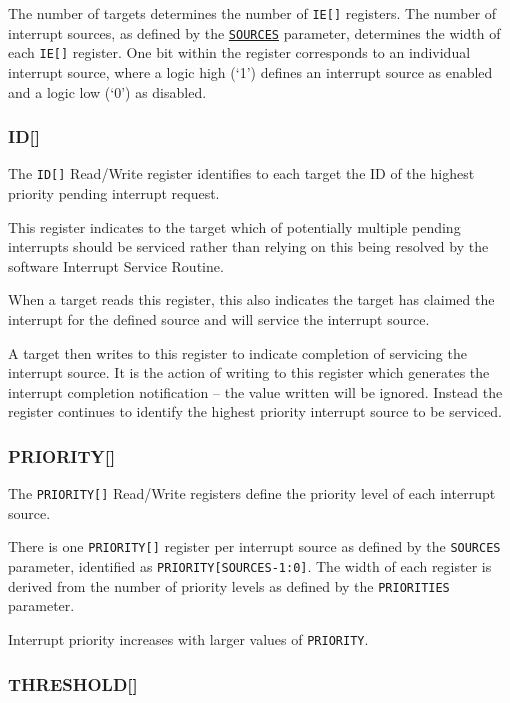 The number of targets determines the number of \texttt{IE[]} registers.
The number of interrupt sources, as defined by the \protect\hyperlink{SOURCES}{\texttt{SOURCES}} parameter, determines the width of each \texttt{IE[]} register.
One bit within the register corresponds to an individual interrupt source, where a logic high (`1') defines an interrupt source as enabled and a logic low (`0') as disabled.

\subsubsection{ID[]}

The \texttt{ID[]} Read/Write register identifies to each target the ID of the highest priority pending interrupt request.

This register indicates to the target which of potentially multiple
pending interrupts should be serviced rather than relying on this being
resolved by the software Interrupt Service Routine.

When a target reads this register, this also indicates the target has
claimed the interrupt for the defined source and will service the interrupt source.

A target then writes to this register to indicate completion of servicing the interrupt source.
It is the action of writing to this register which generates the interrupt completion notification -- the
value written will be ignored. Instead the register continues to identify the highest priority interrupt source to be serviced.

\subsubsection{PRIORITY[]}

The \texttt{PRIORITY[]} Read/Write registers define the priority level of each interrupt source.

There is one \texttt{PRIORITY[]} register per interrupt source as defined by the \texttt{SOURCES} parameter, identified as \texttt{PRIORITY[SOURCES-1:0]}. The width of each register is derived from the number of priority levels as defined by the \texttt{PRIORITIES} parameter.

Interrupt priority increases with larger values of \texttt{PRIORITY}.

\subsubsection{THRESHOLD[]}

